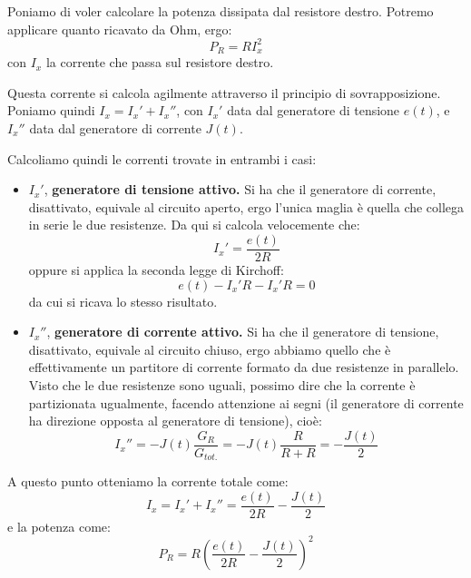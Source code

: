 \documentclass[a4paper,11pt]{article}
\begin{document}
Poniamo di voler calcolare la potenza dissipata dal resistore destro.
Potremo applicare quanto ricavato da Ohm, ergo:
$$
P_R = R I_x^2
$$
con $I_x$ la corrente che passa sul resistore destro.

Questa corrente si calcola agilmente attraverso il principio di sovrapposizione.
Poniamo quindi $I_x = I_x' + I_x''$, con $I_x'$ data dal generatore di tensione $e(t)$, e $I_x''$ data dal generatore di corrente $J(t)$.

Calcoliamo quindi le correnti trovate in entrambi i casi:
\begin{itemize}
	\item $I_x'$, \textbf{generatore di tensione attivo.} 
		Si ha che il generatore di corrente, disattivato, equivale al circuito aperto, ergo l'unica maglia è quella che collega in serie le due resistenze.
		Da qui si calcola velocemente che:
		$$ I_x' = \frac{e(t)}{2R} $$
		oppure si applica la seconda legge di Kirchoff:
		$$ e(t) - I_x' R - I_x'R = 0 $$
		da cui si ricava lo stesso risultato.
	\item $I_x''$, \textbf{generatore di corrente attivo.}
		Si ha che il generatore di tensione, disattivato, equivale al circuito chiuso, ergo abbiamo quello che è effettivamente un partitore di corrente formato da due resistenze in parallelo.
		Visto che le due resistenze sono uguali, possimo dire che la corrente è partizionata ugualmente, facendo attenzione ai segni (il generatore di corrente ha direzione opposta al generatore di tensione), cioè:
		$$ I_x'' = -J(t) \frac{G_R}{G_{tot.}} = -J(t) \frac{R}{R + R} = -\frac{J(t)}{2}$$
\end{itemize}

A questo punto otteniamo la corrente totale come:
$$ I_x = I_x' + I_x'' = \frac{e(t)}{2R} - \frac{J(t)}{2} $$
e la potenza come:
$$ P_R = R \left( \frac{e(t)}{2R} - \frac{J(t)}{2} \right)^2 $$
\end{document}
